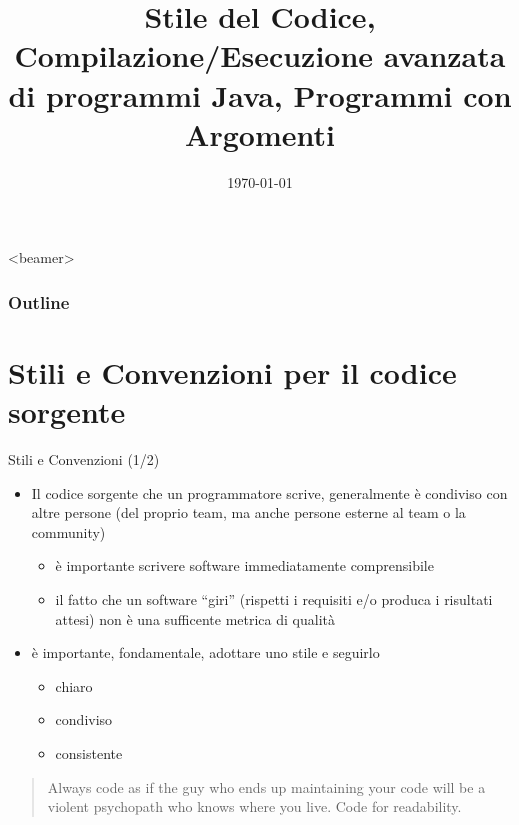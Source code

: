 \documentclass[presentation]{beamer}
\title[{\lab} -- Strumenti Avanzati]{Stile del Codice, Compilazione/Esecuzione avanzata di programmi Java, Programmi con Argomenti}
\date[\today]{\today}
\begin{document}
\frame[label=coverpage]{\titlepage}

\begin{frame}<beamer>
	\frametitle{Outline}
	\tableofcontents[]
\end{frame}


\section{Stili e Convenzioni per il codice sorgente}

\begin{frame}{Stili e Convenzioni (1/2)}
	\begin{itemize}\itemsep10pt
		\item Il codice sorgente che un programmatore scrive, generalmente è condiviso con altre persone (del proprio team, ma anche persone esterne al team o la community)
		\begin{itemize}
			\item è importante scrivere software immediatamente comprensibile
			\item il fatto che un software ``giri'' (rispetti i requisiti e/o produca i risultati attesi) non è una sufficente metrica di qualità
		\end{itemize}
		\item è importante, fondamentale, adottare uno stile e seguirlo
		\begin{itemize}
			\item chiaro
			\item condiviso
			\item consistente
		\end{itemize}
	\end{itemize}

\begin{block}{}
\begin{quote}
Always code as if the guy who ends up maintaining your code will be a violent psychopath who knows where you live. Code for readability.
\end{quote}
\end{block}
\end{frame}
\end{document}
